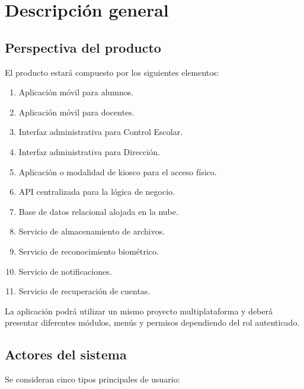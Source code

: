 \documentclass[12pt,a4paper]{article}
\begin{document}
\section{Descripción general}

\subsection{Perspectiva del producto}

El producto estará compuesto por los siguientes elementos:

\begin{enumerate}[leftmargin=*]
\item Aplicación móvil para alumnos.
\item Aplicación móvil para docentes.
\item Interfaz administrativa para Control Escolar.
\item Interfaz administrativa para Dirección.
\item Aplicación o modalidad de kiosco para el acceso físico.
\item API centralizada para la lógica de negocio.
\item Base de datos relacional alojada en la nube.
\item Servicio de almacenamiento de archivos.
\item Servicio de reconocimiento biométrico.
\item Servicio de notificaciones.
\item Servicio de recuperación de cuentas.
\end{enumerate}

La aplicación podrá utilizar un mismo proyecto multiplataforma y deberá
presentar diferentes módulos, menús y permisos dependiendo del rol autenticado.

\subsection{Actores del sistema}

Se consideran cinco tipos principales de usuario:
\end{document}
